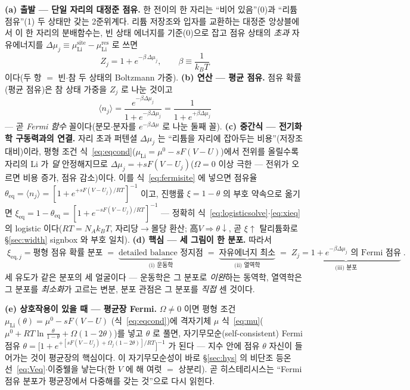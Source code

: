 \documentclass[11pt,a4paper]{article}
\newcommand{\eq}{\mathrm{eq}}
\begin{document}
\textbf{(a) 출발 — 단일 자리의 대정준 점유.} 한 전이의 한 자리는 ``비어 있음''(0)과 ``리튬 점유''(1) 두 상태만 갖는
2준위계다. 리튬 저장조와 입자를 교환하는 대정준 앙상블에서 이 한 자리의 분배함수는, 빈 상태 에너지를 기준($0$)으로 잡고
점유 상태의 \emph{초과} 자유에너지를 $\Delta\mu_j\equiv\mu_\mathrm{Li}^\mathrm{site}-\mu_\mathrm{Li}^\mathrm{res}$ 로 쓰면
\begin{equation}
Z_j=1+e^{-\beta\,\Delta\mu_j},\qquad \beta\equiv\frac{1}{k_BT}
\label{eq:zsite}
\end{equation}
이다(두 항 $=$ 빈$\cdot$참 두 상태의 Boltzmann 가중). \textbf{(b) 연산 — 평균 점유.} 점유 확률(평균 점유)은 참 상태
가중을 $Z_j$ 로 나눈 것이고
\begin{equation}
\langle n_j\rangle=\frac{e^{-\beta\Delta\mu_j}}{1+e^{-\beta\Delta\mu_j}}
=\frac{1}{1+e^{+\beta\Delta\mu_j}}
\label{eq:fermisite}
\end{equation}
— 곧 \emph{Fermi 함수} 꼴이다(분모$\cdot$분자를 $e^{-\beta\Delta\mu}$ 로 나눈 둘째 꼴). \textbf{(c) 중간식 — 전기화학
구동력과의 연결.} 자리 초과 퍼텐셜 $\Delta\mu_j$ 는 ``리튬을 자리에 잡아두는 비용''(저장조 대비)이라, 평형 조건
식~\eqref{eq:eqcond}($\mu_\mathrm{Li}=\mu^0-sF(V-U)$)에서 전위를 올릴수록 자리의 Li 가 \emph{덜} 안정해지므로
$\Delta\mu_j=+sF(V-U_j)$($\Omega=0$ 이상 극한 — 전위가 오르면 비용 증가, 점유 감소)이다. 이를 식~\eqref{eq:fermisite} 에
넣으면 점유율 $\theta_\eq=\langle n_j\rangle=[1+e^{+sF(V-U_j)/RT}]^{-1}$ 이고, 진행률 $\xi=1-\theta$ 의 부호 약속으로 옮기면
$\xi_\eq=1-\theta_\eq=[1+e^{-sF(V-U_j)/RT}]^{-1}$ — 정확히 식~\eqref{eq:logisticsolve}$\cdot$\eqref{eq:xieq} 의
logistic 이다($RT=N_A k_B T$, 자리당$\to$몰당 환산; 高$V\Rightarrow\theta\!\downarrow$, 곧 $\xi\!\uparrow$ 탈리튬화로
\S\ref{sec:width} signbox 와 부호 일치).
\textbf{(d) 핵심 — 세 그림이 한 분포.} 따라서
\begin{equation}
\boxed{\;\xi_{\eq,j}=\text{평형 점유 확률 분포}\;=\;
\underbrace{\text{detailed balance 정지점}}_{\text{(i) 운동학}}
\;=\;\underbrace{\text{자유에너지 최소}}_{\text{(ii) 열역학}}
\;=\;\underbrace{Z_j=1+e^{-\beta\Delta\mu_j}\text{ 의 Fermi 점유}}_{\text{(iii) 분포}}\;.}
\label{eq:threeviews}
\end{equation}
세 유도가 같은 분포의 세 얼굴이다 — 운동학은 그 분포로 \emph{이완}하는 동역학, 열역학은 그 분포를 \emph{최소화}가
고르는 변분, 분포 관점은 그 분포를 \emph{직접} 센 것이다.

\textbf{(e) 상호작용이 있을 때 — 평균장 Fermi.} $\Omega\ne0$ 이면 평형 조건 $\mu_\mathrm{Li}(\theta)=\mu^0-sF(V-U)$
(식~\eqref{eq:eqcond})에 격자기체 $\mu$ 식~\eqref{eq:mu}($\mu^0+RT\ln\frac{\theta}{1-\theta}+\Omega(1-2\theta)$)를 넣고
$\theta$ 로 풀면, 자기무모순(self-consistent) Fermi 점유
$\theta=\big[1+e^{+[sF(V-U_j)+\Omega_j(1-2\theta)]/RT}\big]^{-1}$ 가 된다 — 지수 안에 점유 $\theta$ 자신이 들어가는 것이
평균장의 핵심이다. 이 자기무모순성이 바로 \S\ref{sec:hys} 의 비단조 등온선~\eqref{eq:Veq}$\cdot$이중웰을 낳는다(한 $V$ 에
해 여럿 $=$ 상분리). 곧 히스테리시스는 ``Fermi 점유 분포가 평균장에서 다중해를 갖는 것''으로 다시 읽힌다.
\end{document}

